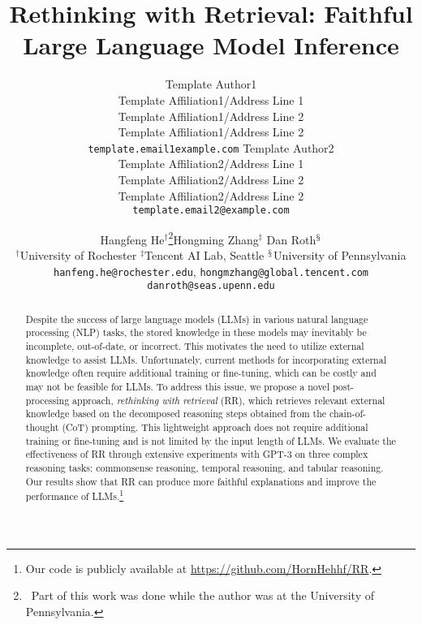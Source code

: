 \documentclass[11pt,a4paper]{article}
\title{Rethinking with Retrieval: Faithful Large Language Model Inference}
\author{
  Template Author1\Thanks{The {\em actual} contributors to this instruction
    document and corresponding template file are given in Section
    \ref{sec:contributors}.} 
  \\
  Template Affiliation1/Address Line 1
  \\
  Template Affiliation1/Address Line 2
  \\
  Template Affiliation1/Address Line 2
  \\
  \texttt{template.email1example.com}
  \And
  Template Author2 
  \\
  Template Affiliation2/Address Line 1
  \\
  Template Affiliation2/Address Line 2
  \\
  Template Affiliation2/Address Line 2
  \\
  \texttt{template.email2@example.com}
}
\author{Hangfeng He$^\dag$\thanks{\, Part of this work was done while the author was at the University of Pennsylvania.}\qquad Hongming Zhang$^\ddagger$ \qquad Dan Roth$^\mathsection$ \\
  $^\dag$University of Rochester\qquad
  $^\ddagger$Tencent AI Lab, Seattle \qquad
  $^\mathsection$University of Pennsylvania\\
\texttt{hanfeng.he@rochester.edu}, \texttt{hongmzhang@global.tencent.com} \\ \texttt{danroth@seas.upenn.edu}
}
\date{}
\newcommand{\NAME}[0]{\textsc{RR}}
\begin{document}
\maketitle
\begin{abstract}
Despite the success of large language models (LLMs) in various natural language processing (NLP) tasks, the stored knowledge in these models may inevitably be incomplete, out-of-date, or incorrect. This motivates the need to utilize external knowledge to assist LLMs. Unfortunately, current methods for incorporating external knowledge often require additional training or fine-tuning, which can be costly and may not be feasible for LLMs. To address this issue, we propose a novel post-processing approach, \textit{rethinking with retrieval} (\NAME{}), which retrieves relevant external knowledge based on the decomposed reasoning steps obtained from the chain-of-thought (CoT) prompting. This lightweight approach does not require additional training or fine-tuning and is not limited by the input length of LLMs. We evaluate the effectiveness of \NAME{} through extensive experiments with GPT-3 on three complex reasoning tasks: commonsense reasoning, temporal reasoning, and tabular reasoning. Our results show that \NAME{} can produce more faithful explanations and improve the performance of LLMs.\footnote{Our code is publicly available at \url{https://github.com/HornHehhf/RR}.}

\end{abstract}








\clearpage



\clearpage
\appendix

\end{document}
